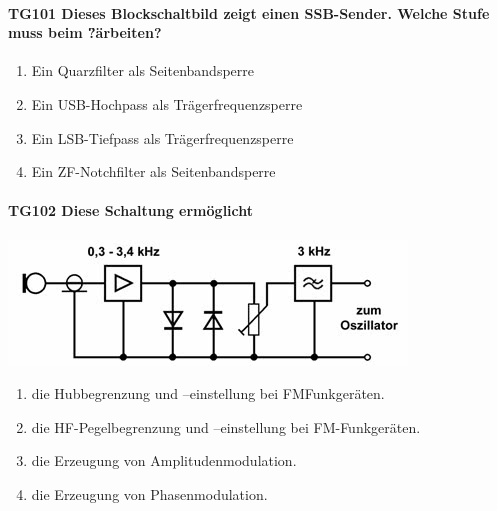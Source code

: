 \documentclass[8pt]{article}
\begin{document}
\paragraph*{TG101 Dieses Blockschaltbild zeigt einen SSB-Sender. Welche Stufe muss beim \"?\" arbeiten?} 
\begin{enumerate}[nolistsep,label=\Alph*]
\item Ein Quarzfilter als Seitenbandsperre
\item Ein USB-Hochpass als Trägerfrequenzsperre
\item Ein LSB-Tiefpass als Trägerfrequenzsperre
\item Ein ZF-Notchfilter als Seitenbandsperre
\end{enumerate}

\paragraph*{TG102 Diese Schaltung ermöglicht}
\begin{center}
	\begin{minipage}{\linewidth}
		\centering
		\includegraphics[scale=1.0]{pics/tg102_a.jpg}
	\end{minipage}
\end{center}
\begin{enumerate}[nolistsep,label=\Alph*]
\item die Hubbegrenzung und –einstellung bei FMFunkgeräten.
\item die HF-Pegelbegrenzung und –einstellung bei FM-Funkgeräten.
\item die Erzeugung von Amplitudenmodulation.
\item die Erzeugung von Phasenmodulation.
\end{enumerate}
\end{document}

